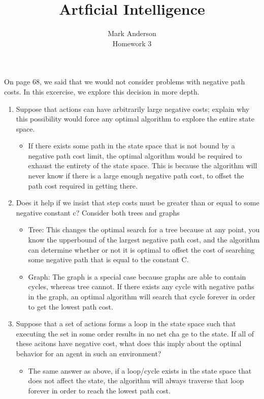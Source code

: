 \documentclass[12pt]{article}
\begin{document}
 
\title{Artficial Intelligence} 
\author{Mark Anderson\\ 
Homework 3} 
 
\maketitle
On page 68, we said that we would not consider problems with negative path costs.  In this excercise, we explore this decision in more depth.
\begin{enumerate}
  \item Suppose that actions can have arbitrarily large negative costs; explain why this possibility would force any optimal algorithm to explore the entire state space. \par 
    \begin{itemize}
      \item If there exists some path in the state space that is not bound by a negative path cost limit, the optimal algorithm would be required to exhaust the entirety of the state space.  This is because the algorithm will never know if there is a large enough negative path cost, to offset the path cost required in getting there.
    \end{itemize}
  \item Does it help if we insist that step costs must be greater than or equal to some negative constant c?  Consider both trees and graphs \par 
    \begin{itemize}
      \item Tree: This changes the optimal search for a tree because at any point, you know the upperbound of the largest negative path cost, and the algorithm can determine whether or not it is optimal to offset the cost of searching some negative path that is equal to the constant C.
      \item Graph: The graph is a special case because graphs are able to contain cycles, whereas tree cannot.  If there exists any cycle with negative paths in the graph, an optimal algorithm will search that cycle forever in order to get the lowest path cost.
        
    \end{itemize}
    
  \item Suppose that a set of actions forms a loop in the state space such that executing the set in some order results in no net cha ge to the state.  If all of these acitons have negative cost, what does this imply about the optinal behavior for an agent in such an environment? 
    \begin{itemize}
      \item The same answer as above, if a loop/cycle exists in the state space that does not affect the state, the algorithm will always traverse that loop forever in order to reach the lowest path cost.
    \end{itemize}

\end{enumerate}
\end{document}
